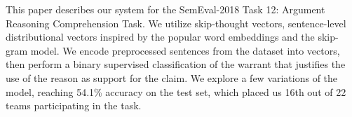 This paper describes our system for the SemEval-2018 Task 12: Argument Reasoning Comprehension Task. We utilize skip-thought vectors, sentence-level distributional vectors inspired by the popular word embeddings and the skip-gram model. We encode preprocessed sentences from the dataset into vectors, then perform a binary supervised classification of the warrant that justifies the use of the reason as support for the claim. We explore a few variations of the model, reaching 54.1\% accuracy on the test set, which placed us 16th out of 22 teams participating in the task.
